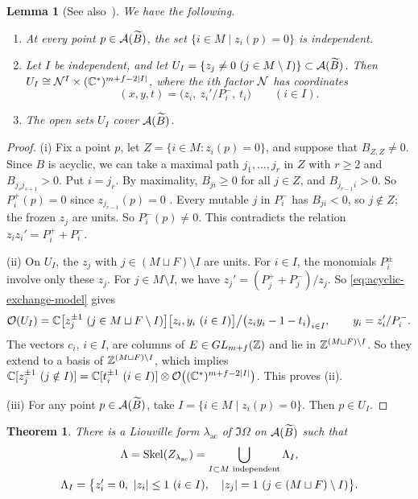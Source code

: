 \documentclass[12pt, letter]{amsart}
\newtheorem{lemma}[dummy]{Lemma}
\newtheorem{theorem}[dummy]{Theorem}
\theoremstyle{definition}
\begin{document}
\begin{lemma}
[{See also~\cite[Proposition~2.1]{LiuLiuVectorBundles}}]
\label{lem:acyclic-node-charts}
We have the following.
\begin{enumerate}[label=\textup{(\roman*)}]
\item At every point \(p\in\mathcal{A}(\widetilde B)\), the set $\{i\in M \mid z_i(p)=0\}$ is independent.
\item Let $I$ be independent, and let $U_I=\{z_j\ne0\ (j\in M\setminus I)\}\subset\mathcal{A}(\widetilde B)$.
Then $U_I\cong\mathcal{N}^{I}\times(\mathbb{C}^*)^{m+f-2|I|}$, where the $i$th factor $\mathcal{N}$ has coordinates
\[
 (x,y,t)=\bigl(z_i,\ z_i'/P_i^-,\ t_i\bigr)\qquad(i\in I).
\]
\item The open sets $U_I$ cover $\mathcal{A}(\widetilde B)$.
\end{enumerate}
\end{lemma}

\begin{proof}
(i) Fix a point \(p\), let $Z=\{i\in M:z_i(p)=0\}$, and suppose that $B_{Z,Z}\ne0$.
Since \(B\) is acyclic, we can take a maximal path $j_1,\dots,j_r$ in $Z$ with $r\ge2$ and $B_{j_sj_{s+1}}>0$.
Put \(i = j_r\). 
By maximality,  $B_{ji}\ge0$ for all $j\in Z$, and $B_{j_{r-1}i}>0$.
So $P_i^+(p)=0$ since \(z_{j_{r-1}}(p) = 0\) .
Every mutable $j$ in $P_i^-$ has $B_{ji}<0$, so $j\notin Z$; the frozen $z_j$ are units.
So $P_i^-(p)\ne0$. This contradicts the relation $z_iz_i'=P_i^+ + P_i^-$.

(ii) On $U_I$, the $z_j$ with $j\in(M\sqcup F)\setminus I$ are units. 
For $i\in I$, the monomials $P_i^\pm$ involve only these $z_j$.
For $j\in M\setminus I$, we have $z_j'=(P_j^++P_j^-)/z_j$.
So \eqref{eq:acyclic-exchange-model} gives
\[
 \mathcal{O}(U_I)=\mathbb{C}\bigl[z_j^{\pm1}\ (j\in M \sqcup F \setminus I)\bigr]\bigl[z_i,y_i\ (i\in I)\bigr]\big/\bigl(z_iy_i-1-t_i\bigr)_{i\in I},
 \qquad y_i=z_i'/P_i^-.
\]
The vectors $c_i$, $i\in I$, are columns of $E\in GL_{m+f}(\mathbb{Z})$ and lie in $\mathbb{Z}^{(M\sqcup F)\setminus I}$.
So they extend to a basis of $\mathbb{Z}^{(M\sqcup F)\setminus I}$, which implies $\mathbb{C}[z_j^{\pm1}\ (j\notin I)]=\mathbb{C}[t_i^{\pm1}\ (i\in I)]\otimes\mathcal{O}\bigl((\mathbb{C}^*)^{m+f-2|I|}\bigr)$. This proves (ii). 


(iii) For any point \(p\in \mathcal{A}(\widetilde B)\), take $I = \{ i \in M \mid z_i(p) = 0\}$. Then \( p \in U_I\). 
\end{proof}





\begin{theorem}\label{thm:acyclic-skeleton}
There is a Liouville form $\lambda_{\mathrm{ac}}$ of $\Im\Omega$ on $\mathcal{A}(\widetilde B)$ such that
\begin{equation}\label{eq:acyclic-skeleton}
 \begin{gathered}
 \Lambda=\Skel(Z_{\lambda_{\mathrm{ac}}})=\bigcup_{I\subset M\text{ independent}}\Lambda_I,\\
 \Lambda_I=\bigl\{z_i'=0,\ |z_i|\le1\ (i\in I),\quad |z_j|=1\ (j\in(M\sqcup F)\setminus I)\bigr\}.
 \end{gathered}
\end{equation}


\end{theorem}
\end{document}
